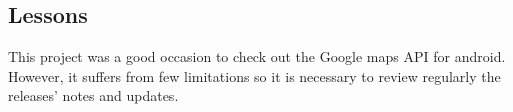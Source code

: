 \documentclass[10pt,a4paper]{article} %
\begin{document}
\subsection{Lessons}

This project was a good occasion to check out the Google maps API for android. However, it suffers from few limitations so it is necessary to review regularly the releases’ notes and updates.

    
    
    
    \nocite{*}
    
    
    

    
    
    
    
\end{document}
